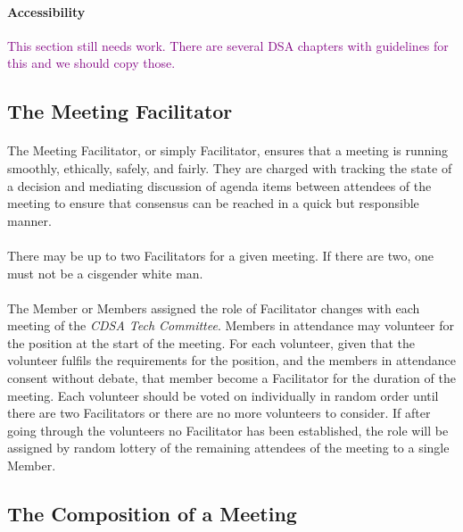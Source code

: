 \documentclass[12pt,letter,twocolumn,oneside,draft]{article}
\newcommand{\note}[1]{\textcolor{purple}{#1}}
\newcommand{\cname}{\emph{CDSA Tech Committee}}
\begin{document}
\paragraph{Accessibility}
\note{This section still needs work. There are several DSA chapters with
guidelines for this and we should copy those.}

\subsection{The Meeting Facilitator}

\paragraph{}
The Meeting Facilitator, or simply Facilitator, ensures that a meeting is
running smoothly, ethically, safely, and fairly. They are charged with tracking
the state of a decision and mediating discussion of agenda items between
attendees of the meeting to ensure that consensus can be reached in a quick but
responsible manner.

\paragraph{}
There may be up to two Facilitators for a given meeting. If there are two, one
must not be a cisgender white man.

\paragraph{} 
The Member or Members assigned the role of Facilitator changes with each
meeting of the \cname{}. Members in attendance may volunteer for the position
at the start of the meeting. For each volunteer, given that the volunteer
fulfils the requirements for the position, and the members in attendance
consent without debate, that member become a Facilitator for the duration of
the meeting. Each volunteer should be voted on individually in random order
until there are two Facilitators or there are no more volunteers to consider.
If after going through the volunteers no Facilitator has been established, the
role will be assigned by random lottery of the remaining attendees of the
meeting to a single Member. 

\subsection{The Composition of a Meeting}
\end{document}
